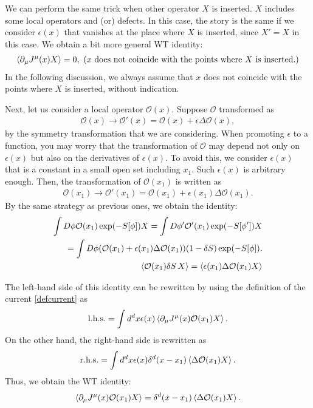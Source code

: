 \documentclass[12pt]{scrartcl}
\newcommand{\del}{\partial}
\newcommand{\Ocal}{\mathcal{O}}
\begin{document}
We can perform the same trick when other operator $X$ is inserted.  $X$ includes some local operators and (or) defects.  In this case, the story is the same if we consider $\epsilon(x)$ that vanishes at the place where $X$ is inserted, since $X'=X$ in this case.  We obtain a bit more general WT identity:
\begin{align}
    \expval{\del_{\mu}J^{\mu}(x) X}=0,\ (x \text{ does not coincide with the points where $X$ is inserted.})
    \label{WTid0.5}
\end{align}
In the following discussion, we always assume that $x$ does not coincide with the points where $X$ is inserted, without indication.

Next, let us consider a local operator $\Ocal(x)$.  Suppose $\Ocal$ transformed as
\begin{align}
    \Ocal(x)\to \Ocal'(x)=\Ocal(x)+\epsilon \Delta \Ocal(x),
\end{align}
by the symmetry transformation that we are considering.  When promoting $\epsilon$ to a function, you may worry that the transformation of $\Ocal$ may depend not only on $\epsilon(x)$ but also on the derivatives of $\epsilon(x)$.  To avoid this, we consider $\epsilon(x)$ that is a constant in a small open set including $x_1$.  Such $\epsilon(x)$ is arbitrary enough.  Then, the transformation of $\Ocal(x_1)$ is written as
\begin{align}
    \Ocal(x_1)\to \Ocal'(x_1)=\Ocal(x_1)+\epsilon(x_1) \Delta \Ocal(x_1).
\end{align}
By the same strategy as previous ones, we obtain the identity:
\begin{align}
    \int D\phi \Ocal(x_1)\exp(-S[\phi])X
    =\int D\phi' \Ocal'(x_1)\exp(-S[\phi'])X\nonumber\\
    =\int D\phi (\Ocal(x_1)+\epsilon(x_1)\Delta \Ocal(x_1))(1-\delta S)\exp(-S[\phi]).\nonumber\\
    \expval{\Ocal(x_1)\delta S\, X}
    =\expval{\epsilon(x_1)\Delta \Ocal(x_1)X} \label{tempWT0}
\end{align}


The left-hand side of this identity can be rewritten by using the definition of the current \eqref{defcurrent} as
\begin{align}
    \mathrm{l.h.s.}=\int d^dx \epsilon(x)\expval{\del_{\mu}J^{\mu}(x)\Ocal(x_1)X}.
\end{align}
On the other hand, the right-hand side is rewritten as
\begin{align}
    \mathrm{r.h.s.}=\int d^dx \epsilon(x)\delta^d(x-x_1)\expval{\Delta \Ocal(x_1)X}.
\end{align}
Thus, we obtain the WT identity:
\begin{align}
    \expval{\del_{\mu}J^{\mu}(x) \Ocal(x_1)X}=\delta^d(x-x_1)\expval{\Delta \Ocal(x_1)X}.
    \label{contWTid2}
\end{align}
\end{document}
